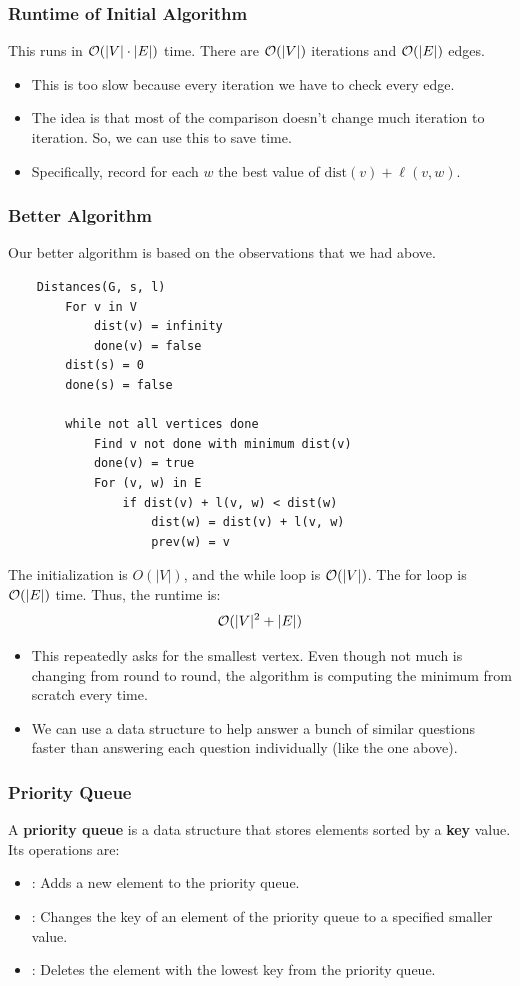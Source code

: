 \documentclass[letterpaper]{article}
\begin{document}
\subsubsection{Runtime of Initial Algorithm}
This runs in $\mathcal{O}(|V| \cdot |E|)$ time. There are $\mathcal{O}(|V|)$ iterations and $\mathcal{O}(|E|)$ edges.
\begin{itemize}
    \item This is too slow because every iteration we have to check every edge. 
    \item The idea is that most of the comparison doesn't change much iteration to iteration. So, we can use this to save time. 
    \item Specifically, record for each $w$ the best value of $\text{dist}(v) + \ell(v, w)$. 
\end{itemize}

\subsubsection{Better Algorithm}
Our better algorithm is based on the observations that we had above.
\begin{verbatim}
    Distances(G, s, l)
        For v in V 
            dist(v) = infinity 
            done(v) = false 
        dist(s) = 0
        done(s) = false 

        while not all vertices done 
            Find v not done with minimum dist(v)
            done(v) = true 
            For (v, w) in E 
                if dist(v) + l(v, w) < dist(w)
                    dist(w) = dist(v) + l(v, w)
                    prev(w) = v
\end{verbatim}
The initialization is $O(|V|)$, and the while loop is $\mathcal{O}(|V|)$. The for loop is $\mathcal{O}(|E|)$ time. Thus, the runtime is: 
\[\mathcal{O}(|V|^2 + |E|)\]
\begin{itemize}
    \item This repeatedly asks for the smallest vertex. Even though not much is changing from round to round, the algorithm is computing the minimum from scratch every time.
    \item We can use a data structure to help answer a bunch of similar questions faster than answering each question individually (like the one above).
\end{itemize}

\subsubsection{Priority Queue}
A \textbf{priority queue} is a data structure that stores elements sorted by a \textbf{key} value. Its operations are: 
\begin{itemize}
    \item {}: Adds a new element to the priority queue.
    \item {}: Changes the key of an element of the priority queue to a specified smaller value. 
    \item {}: Deletes the element with the lowest key from the priority queue. 
\end{itemize}
\end{document}
